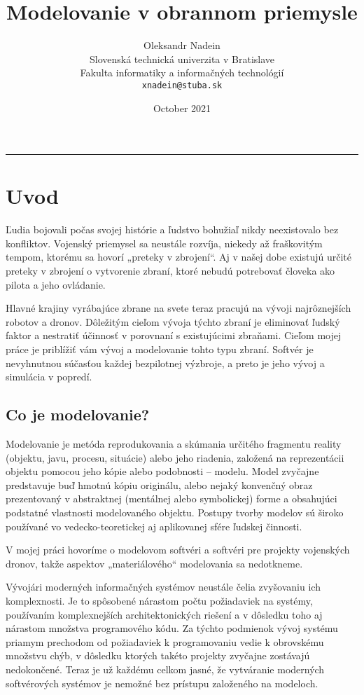 \documentclass{article}
\title{Modelovanie v obrannom priemysle}
\author{Oleksandr Nadein\\[2pt]
	{\small Slovenská technická univerzita v Bratislave}\\
	{\small Fakulta informatiky a informačných technológií}\\
	{\small \texttt{xnadein@stuba.sk}}
	}
\date{\small October 2021}
\begin{document}
\maketitle

\noindent\rule{12cm}{0.4pt}


\tableofcontents

\newpage
\section{Uvod}

\large Ľudia bojovali počas svojej histórie a ľudstvo bohužiaľ nikdy neexistovalo bez konfliktov. Vojenský priemysel sa neustále rozvíja, niekedy až fraškovitým tempom, ktorému sa hovorí „preteky v zbrojení“. Aj v našej dobe existujú určité preteky v zbrojení o vytvorenie zbraní, ktoré nebudú potrebovať človeka ako pilota a jeho ovládanie. 

Hlavné krajiny vyrábajúce zbrane na svete teraz pracujú na vývoji najrôznejších robotov a dronov. Dôležitým cieľom vývoja týchto zbraní je eliminovať ľudský faktor a nestratiť účinnosť v porovnaní s existujúcimi zbraňami. Cieľom mojej práce je priblížiť vám vývoj a modelovanie tohto typu zbraní. Softvér je nevyhnutnou súčasťou každej bezpilotnej výzbroje, a preto je jeho vývoj a simulácia v popredí.

\newpage

\subsection{Co je modelovanie?}

\cite{Hana2019}Modelovanie je metóda reprodukovania a skúmania určitého fragmentu reality (objektu, javu, procesu, situácie) alebo jeho riadenia, založená na reprezentácii objektu pomocou jeho kópie alebo podobnosti – modelu. Model zvyčajne predstavuje buď hmotnú kópiu originálu, alebo nejaký konvenčný obraz prezentovaný v abstraktnej (mentálnej alebo symbolickej) forme a obsahujúci podstatné vlastnosti modelovaného objektu. Postupy tvorby modelov sú široko používané vo vedecko-teoretickej aj aplikovanej sfére ľudskej činnosti.

V mojej práci hovoríme o modelovom softvéri a softvéri pre projekty vojenských dronov, takže aspektov „materiálového“ modelovania sa nedotkneme.

Vývojári moderných informačných systémov neustále čelia zvyšovaniu ich komplexnosti. Je to spôsobené nárastom počtu požiadaviek na systémy, používaním komplexnejších architektonických riešení a v dôsledku toho aj nárastom množstva programového kódu. Za týchto podmienok vývoj systému priamym prechodom od požiadaviek k programovaniu vedie k obrovskému množstvu chýb, v dôsledku ktorých takéto projekty zvyčajne zostávajú nedokončené.\cite{8109257} Teraz je už každému celkom jasné, že vytváranie moderných softvérových systémov je nemožné bez prístupu založeného na modeloch.
\end{document}
